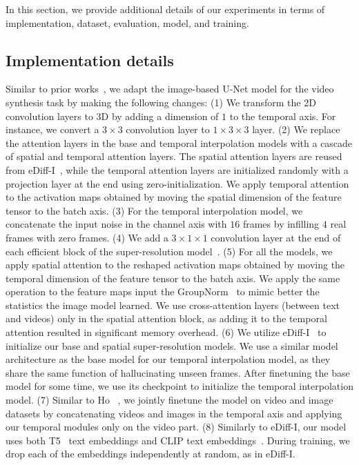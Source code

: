 \documentclass[10pt,twocolumn,letterpaper]{article}
\newcommand{\ediffi}{eDiff-I\xspace}
\begin{document}
In this section, we provide additional details of our experiments in terms of implementation, dataset, evaluation, model, and training.

\subsection{Implementation details}

Similar to prior works~\cite{ho2022video, singer2022make}, we adapt the image-based U-Net model for the video synthesis task by making the following changes: (1) We transform the 2D convolution layers to 3D by adding a dimension of $1$ to the temporal axis. For instance, we convert a $3 \times 3$ convolution layer to $1 \times 3 \times 3$ layer. (2) We replace the attention layers in the base and temporal interpolation models with a cascade of spatial and temporal attention layers. The spatial attention layers are reused from \ediffi~\cite{balaji2022ediffi}, while the temporal attention layers are initialized randomly with a projection layer at the end using zero-initialization. We apply temporal attention to the activation maps obtained by moving the spatial dimension of the feature tensor to the batch axis. (3) For the temporal interpolation model, we concatenate the input noise in the channel axis with $16$ frames by infilling $4$ real frames with zero frames. (4) We add a $3 \times 1 \times 1$ convolution layer at the end of each efficient block of the super-resolution model~\cite{saharia2022photorealistic}. (5) For all the models, we apply spatial attention to the reshaped activation maps obtained by moving the temporal dimension of the feature tensor to the batch axis. We apply the same operation to the feature maps input the GroupNorm~\cite{wu2018group} to mimic better the statistics the image model learned. We use cross-attention layers (between text and videos) only in the spatial attention block, as adding it to the temporal attention resulted in significant memory overhead. (6)  We utilize \ediffi~\cite{balaji2022ediffi} to initialize our base and spatial super-resolution models. We use a similar model architecture as the base model for our temporal interpolation model, as they share the same function of hallucinating unseen frames. After finetuning the base model for some time, we use its checkpoint to initialize the temporal interpolation model. (7) Similar to Ho \etal~\cite{ho2022video}, we jointly finetune the model on video and image datasets by concatenating videos and images in the temporal axis and applying our temporal modules only on the video part. (8) Similarly to \ediffi, our model uses both T5~\cite{raffel2020exploring} text embeddings and CLIP text embeddings~\cite{radford2021learning}. During training, we drop each of the embeddings independently at random, as in \ediffi.
\end{document}
